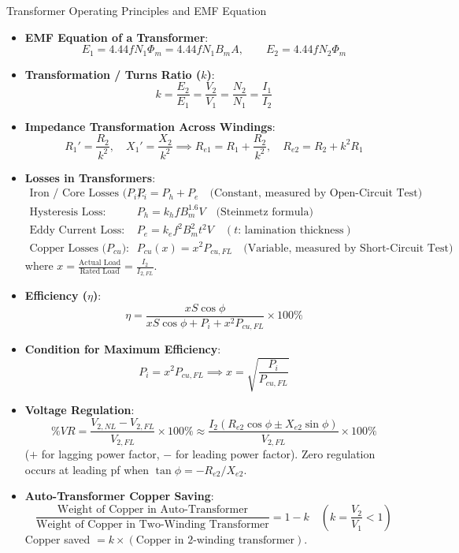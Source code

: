 \begin{formulabox}{Transformer Operating Principles and EMF Equation}
\begin{itemize}[leftmargin=1.5em]
    \item \textbf{EMF Equation of a Transformer}:
    \[ E_1 = 4.44 f N_1 \Phi_m = 4.44 f N_1 B_m A, \qquad E_2 = 4.44 f N_2 \Phi_m \]
    \item \textbf{Transformation / Turns Ratio ($k$)}:
    \[ k = \frac{E_2}{E_1} = \frac{V_2}{V_1} = \frac{N_2}{N_1} = \frac{I_1}{I_2} \]
    \item \textbf{Impedance Transformation Across Windings}:
    \[ R_1' = \frac{R_2}{k^2}, \quad X_1' = \frac{X_2}{k^2} \implies R_{e1} = R_1 + \frac{R_2}{k^2}, \quad R_{e2} = R_2 + k^2 R_1 \]
    \item \textbf{Losses in Transformers}:
    \begin{align*}
        \text{Iron / Core Losses ($P_i$): } & P_i = P_h + P_e \quad \text{(Constant, measured by Open-Circuit Test)} \\
        \text{Hysteresis Loss: } & P_h = k_h f B_m^{1.6} V \quad \text{(Steinmetz formula)} \\
        \text{Eddy Current Loss: } & P_e = k_e f^2 B_m^2 t^2 V \quad (t\text{: lamination thickness}) \\
        \text{Copper Losses ($P_{cu}$): } & P_{cu}(x) = x^2 P_{cu,FL} \quad \text{(Variable, measured by Short-Circuit Test)}
    \end{align*}
    where $x = \frac{\text{Actual Load}}{\text{Rated Load}} = \frac{I_2}{I_{2,FL}}$.
    \item \textbf{Efficiency ($\eta$)}:
    \[ \eta = \frac{x S \cos\phi}{x S \cos\phi + P_i + x^2 P_{cu,FL}} \times 100\% \]
    \item \textbf{Condition for Maximum Efficiency}:
    \[ P_i = x^2 P_{cu,FL} \implies x = \sqrt{\frac{P_i}{P_{cu,FL}}} \]
    \item \textbf{Voltage Regulation}:
    \[ \%VR = \frac{V_{2,NL} - V_{2,FL}}{V_{2,FL}} \times 100\% \approx \frac{I_2(R_{e2}\cos\phi \pm X_{e2}\sin\phi)}{V_{2,FL}} \times 100\% \]
    ($+$ for lagging power factor, $-$ for leading power factor). Zero regulation occurs at leading pf when $\tan\phi = -R_{e2}/X_{e2}$.
    \item \textbf{Auto-Transformer Copper Saving}:
    \[ \frac{\text{Weight of Copper in Auto-Transformer}}{\text{Weight of Copper in Two-Winding Transformer}} = 1 - k \quad \left(k = \frac{V_2}{V_1} < 1\right) \]
    Copper saved $= k \times (\text{Copper in 2-winding transformer})$.
\end{itemize}
\end{formulabox}

